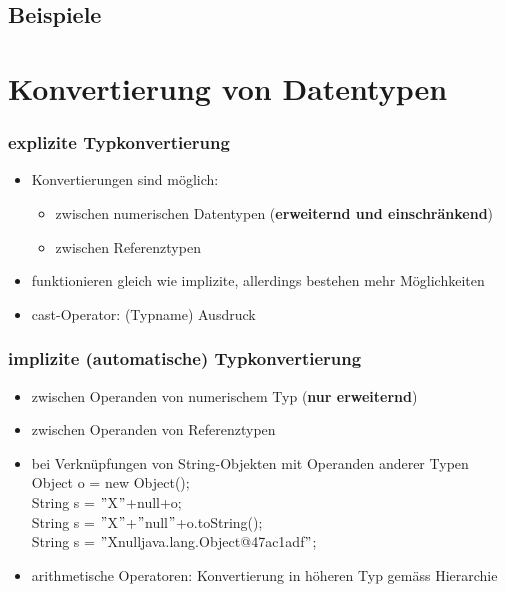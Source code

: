 \documentclass[a4paper,10pt]{article}
\newcommand{\Bold}[1]{\textbf{#1}} %
\begin{document}
\subsection{Beispiele}




\newpage
\section{Konvertierung von Datentypen}

\subsubsection{explizite Typkonvertierung}
\begin{itemize}
	\item Konvertierungen sind m\"oglich:
		\begin{itemize}
			\item zwischen numerischen Datentypen (\Bold {erweiternd und einschr\"ankend})
			\item zwischen Referenztypen
		\end{itemize}
	\item funktionieren gleich wie implizite, allerdings bestehen mehr M\"oglichkeiten
	\item cast-Operator: (Typname) Ausdruck
\end{itemize}

\subsubsection{implizite (automatische) Typkonvertierung}
\begin{itemize}
	\item zwischen Operanden von numerischem Typ (\Bold {nur erweiternd})
	\item zwischen Operanden von Referenztypen
	\item bei Verkn\"upfungen von String-Objekten mit Operanden anderer Typen \\
			    Object o = new Object();\\
			    String s = $"$X$"$+null+o;\\
			   String s = $"$X$"$+$"$null$"$+o.toString();\\
                                   String s = $"$Xnulljava.lang.Object@47ac1adf$"$;
	\item arithmetische Operatoren: Konvertierung in h\"oheren Typ gem\"ass Hierarchie
\end{itemize}
\end{document}
